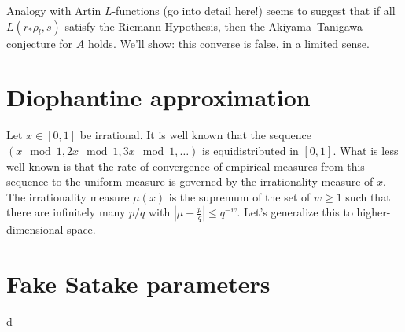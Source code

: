 \documentclass{article}
\begin{document}
Analogy with Artin $L$-functions (go into detail here!) seems to suggest that 
if all $L(r_\ast \rho_l,s)$ satisfy the Riemann Hypothesis, then the 
Akiyama--Tanigawa conjecture for $A$ holds. We'll show: this converse is false, 
in a limited sense. 





\section{Diophantine approximation}

Let $x\in [0,1]$ be irrational. It is well known that the sequence 
$(x\mod 1,2 x\mod 1,3 x\mod 1,\dots)$ is equidistributed in $[0,1]$. What is 
less well known is that the rate of convergence of empirical measures from this 
sequence to the uniform measure is governed by the irrationality measure of 
$x$. The irrationality measure $\mu(x)$ is the supremum of the set of 
$w\geqslant 1$ such that there are infinitely many $p/q$ with 
$\left| \mu - \frac p q\right| \leqslant q^{-w}$. Let's generalize this to 
higher-dimensional space. 





\section{Fake Satake parameters}

d
\end{document}
